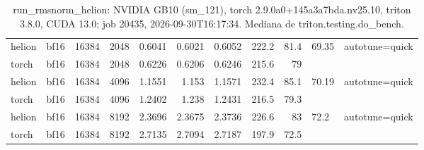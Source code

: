\begin{table}[htbp]
\begin{tabular}{llrrrrrrrll}
    helion & bf16 & 16384 & 2048 & 0.6041 & 0.6021 & 0.6052 & 222.2 & 81.4 & 69.35 & autotune=quick \\
    torch & bf16 & 16384 & 2048 & 0.6226 & 0.6206 & 0.6246 & 215.6 & 79 &  &  \\
    helion & bf16 & 16384 & 4096 & 1.1551 & 1.153 & 1.1571 & 232.4 & 85.1 & 70.19 & autotune=quick \\
    torch & bf16 & 16384 & 4096 & 1.2402 & 1.238 & 1.2431 & 216.5 & 79.3 &  &  \\
    helion & bf16 & 16384 & 8192 & 2.3696 & 2.3675 & 2.3736 & 226.6 & 83 & 72.2 & autotune=quick \\
    torch & bf16 & 16384 & 8192 & 2.7135 & 2.7094 & 2.7187 & 197.9 & 72.5 &  &  \\
    \bottomrule
  \end{tabular}
  \caption{run\_rmsnorm\_helion: NVIDIA GB10 (sm\_121), torch 2.9.0a0+145a3a7bda.nv25.10, triton 3.8.0, CUDA 13.0; job 20435, 2026-09-30T16:17:34. Mediana de triton.testing.do\_bench.}
  \label{tab:patterson-run-rmsnorm-helion}
\end{table}

